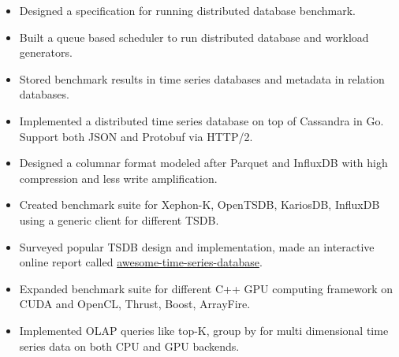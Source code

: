 \documentclass[11pt, letterpaper]{simple-cv}
\begin{document}

\begin{itemize}
	\item Designed a specification for running distributed database benchmark.
	\item Built a queue based scheduler to run distributed database and workload generators.
	\item Stored benchmark results in time series databases and metadata in relation databases.
\end{itemize}


\begin{itemize}
	\item Implemented a distributed time series database on top of Cassandra in Go. Support both JSON and Protobuf via HTTP/2.
	\item Designed a columnar format modeled after Parquet and InfluxDB with high compression and less write amplification.
	\item Created benchmark suite for Xephon-K, OpenTSDB, KariosDB, InfluxDB using a generic client for different TSDB.
	\item Surveyed popular TSDB design and implementation, made an interactive online report called \href{https://xephonhq.github.io/awesome-time-series-database}{awesome-time-series-database}.
\end{itemize}


\begin{itemize}
	\item Expanded benchmark suite for different C++ GPU computing framework on CUDA and OpenCL, Thrust, Boost, ArrayFire.
	\item Implemented OLAP queries like top-K, group by for multi dimensional time series data on both CPU and GPU backends.
\end{itemize}
\end{document}
